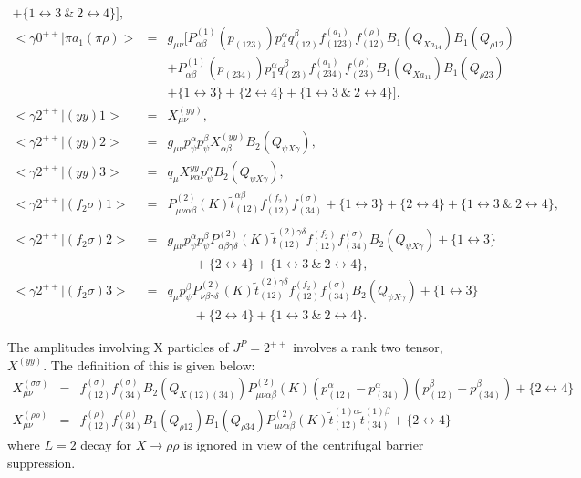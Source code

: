 \begin{eqnarray}
+\{1\leftrightarrow 3 ~\&~ 2\leftrightarrow 4\}], \\
<\gamma 0^{++}|\pi a_{1}(\pi\rho)> \!&=&\!g_{\mu\nu}
[P^{(1)}_{\alpha\beta}(p_{(123)}) p_4^\alpha q_{(12)}^\beta
f_{(123)}^{(a_1)}f_{(12)}^{(\rho)} B_1(Q_{Xa_14})B_1(Q_{\rho 12})
\nonumber\\
& & +P^{(1)}_{\alpha\beta}(p_{(234)}) p_1^\alpha q_{(23)}^\beta
f_{(234)}^{(a_1)}f_{(23)}^{(\rho)} B_1(Q_{Xa_11})B_1(Q_{\rho 23})
                         \nonumber \\ & &
+\{1\leftrightarrow 3\}+\{2\leftrightarrow 4\}
+\{1\leftrightarrow 3 ~\&~ 2\leftrightarrow 4\}],\\
<\gamma 2^{++}|(yy)1>
                  \!&=&\!X_{\mu\nu}^{(yy)},
                         \\
<\gamma 2^{++}|(yy)2>
                  \!&=&\!g_{\mu\nu}p_\psi^\alpha p_\psi^\beta
                  X_{\alpha\beta}^{(yy)}B_2(Q_{\psi X \gamma}),
                          \\
<\gamma 2^{++}|(yy)3> \!&=&\! q_\mu
X_{\nu\alpha}^{yy}p_\psi^\alpha
B_2(Q_{\psi X \gamma}),\\
<\gamma 2^{++}|(f_2\sigma)1> \!&=&\!
P^{(2)}_{\mu\nu\alpha\beta}(K)\tilde t_{(12)}^{\alpha\beta}
f_{(12)}^{(f_2)}f_{(34)}^{(\sigma)} +\{1\leftrightarrow 3\}
+\{2\leftrightarrow 4\} +\{1\leftrightarrow 3 ~\&~
2\leftrightarrow 4\},
                        \nonumber\\ &&\\
<\gamma 2^{++}|(f_2\sigma)2> \!&=&\! g_{\mu\nu} p_\psi^\alpha
p_\psi^\beta P^{(2)}_{\alpha\beta\gamma\delta}(K)\tilde
t_{(12)}^{(2)\gamma\delta}
f_{(12)}^{(f_2)}f_{(34)}^{(\sigma)}B_2(Q_{\psi X \gamma})
+\{1\leftrightarrow 3\} \nonumber\\
& & \quad\quad +\{2\leftrightarrow 4\}+\{1\leftrightarrow 3 ~\&~
2\leftrightarrow 4\}, \\
<\gamma 2^{++}|(f_2\sigma)3> \!&=&\! q_\mu p_\psi^\beta
P^{(2)}_{\nu\beta\gamma\delta}(K)\tilde t_{(12)}^{(2)\gamma\delta}
f_{(12)}^{(f_2)}f_{(34)}^{(\sigma)}B_2(Q_{\psi X \gamma})
+\{1\leftrightarrow 3\} \nonumber\\
& & \quad\quad +\{2\leftrightarrow 4\}+\{1\leftrightarrow 3 ~\&~
2\leftrightarrow 4\}.
\end{eqnarray}

The amplitudes involving X particles of $J^{P}=2^{++}$ involves a
rank two tensor, $X^{(yy)}$. The definition of this is given
below:
\begin{eqnarray}
X_{\mu\nu}^{(\sigma\sigma)}\!&=&\!f_{(12)}^{(\sigma)}f_{(34)}^{(\sigma)}
B_2(Q_{X(12)(34)}) P^{(2)}_{\mu\nu\alpha\beta}(K)
(p_{(12)}^{\alpha}-p_{(34)}^{\alpha})
(p_{(12)}^{\beta}-p_{(34)}^{\beta})+\{2\leftrightarrow 4\}\\
X_{\mu\nu}^{(\rho\rho)} \!&=&\!f_{(12)}^{(\rho)}f_{(34)}^{(\rho)}
B_1(Q_{\rho 12})B_1(Q_{\rho 34})P^{(2)}_{\mu\nu\alpha\beta}(K)
\tilde t_{(12)}^{(1)\alpha} \tilde t_{(34)}^{(1)\beta}
+\{2\leftrightarrow 4\}
\end{eqnarray}
where $L=2$ decay for $X\to\rho\rho$ is ignored in view of the
centrifugal barrier suppression.

